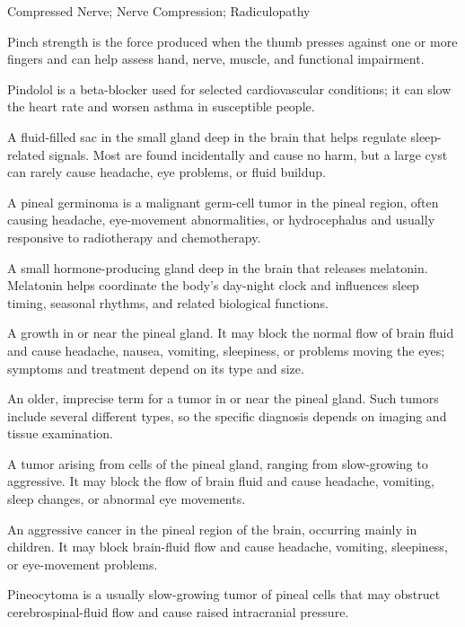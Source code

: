 \synonyms
Compressed Nerve; Nerve Compression; Radiculopathy

 Pinch strength is the force produced when the thumb presses against one or more fingers and can help assess hand, nerve, muscle, and functional impairment.

 Pindolol is a beta-blocker used for selected cardiovascular conditions; it can slow the heart rate and worsen asthma in susceptible people.

 A fluid-filled sac in the small gland deep in the brain that helps regulate sleep-related signals. Most are found incidentally and cause no harm, but a large cyst can rarely cause headache, eye problems, or fluid buildup.

 A pineal germinoma is a malignant germ-cell tumor in the pineal region, often causing headache, eye-movement abnormalities, or hydrocephalus and usually responsive to radiotherapy and chemotherapy.

 A small hormone-producing gland deep in the brain that releases melatonin. Melatonin helps coordinate the body's day-night clock and influences sleep timing, seasonal rhythms, and related biological functions.

 A growth in or near the pineal gland. It may block the normal flow of brain fluid and cause headache, nausea, vomiting, sleepiness, or problems moving the eyes; symptoms and treatment depend on its type and size.

 An older, imprecise term for a tumor in or near the pineal gland. Such tumors include several different types, so the specific diagnosis depends on imaging and tissue examination.

 A tumor arising from cells of the pineal gland, ranging from slow-growing to aggressive. It may block the flow of brain fluid and cause headache, vomiting, sleep changes, or abnormal eye movements.

 An aggressive cancer in the pineal region of the brain, occurring mainly in children. It may block brain-fluid flow and cause headache, vomiting, sleepiness, or eye-movement problems.

 Pineocytoma is a usually slow-growing tumor of pineal cells that may obstruct cerebrospinal-fluid flow and cause raised intracranial pressure.

